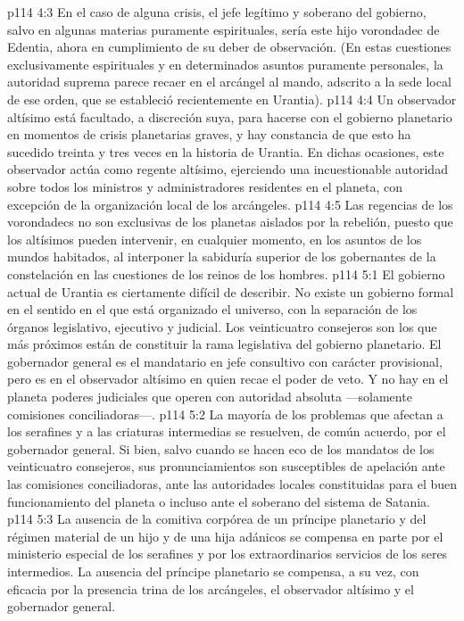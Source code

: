 \vs p114 4:3 En el caso de alguna crisis, el jefe legítimo y soberano del gobierno, salvo en algunas materias puramente espirituales, sería este hijo vorondadec de Edentia, ahora en cumplimiento de su deber de observación. (En estas cuestiones exclusivamente espirituales y en determinados asuntos puramente personales, la autoridad suprema parece recaer en el arcángel al mando, adscrito a la sede local de ese orden, que se estableció recientemente en Urantia).
\vs p114 4:4 \pc Un observador altísimo está facultado, a discreción suya, para hacerse con el gobierno planetario en momentos de crisis planetarias graves, y hay constancia de que esto ha sucedido treinta y tres veces en la historia de Urantia. En dichas ocasiones, este observador actúa como regente altísimo, ejerciendo una incuestionable autoridad sobre todos los ministros y administradores residentes en el planeta, con excepción de la organización local de los arcángeles.
\vs p114 4:5 Las regencias de los vorondadecs no son exclusivas de los planetas aislados por la rebelión, puesto que los altísimos pueden intervenir, en cualquier momento, en los asuntos de los mundos habitados, al interponer la sabiduría superior de los gobernantes de la constelación en las cuestiones de los reinos de los hombres.
\vs p114 5:1 El gobierno actual de Urantia es ciertamente difícil de describir. No existe un gobierno formal en el sentido en el que está organizado el universo, con la separación de los órganos legislativo, ejecutivo y judicial. Los veinticuatro consejeros son los que más próximos están de constituir la rama legislativa del gobierno planetario. El gobernador general es el mandatario en jefe consultivo con carácter provisional, pero es en el observador altísimo en quien recae el poder de veto. Y no hay en el planeta poderes judiciales que operen con autoridad absoluta ---solamente comisiones conciliadoras---.
\vs p114 5:2 La mayoría de los problemas que afectan a los serafines y a las criaturas intermedias se resuelven, de común acuerdo, por el gobernador general. Si bien, salvo cuando se hacen eco de los mandatos de los veinticuatro consejeros, sus pronunciamientos son susceptibles de apelación ante las comisiones conciliadoras, ante las autoridades locales constituidas para el buen funcionamiento del planeta o incluso ante el soberano del sistema de Satania.
\vs p114 5:3 La ausencia de la comitiva corpórea de un príncipe planetario y del régimen material de un hijo y de una hija adánicos se compensa en parte por el ministerio especial de los serafines y por los extraordinarios servicios de los seres intermedios. La ausencia del príncipe planetario se compensa, a su vez, con eficacia por la presencia trina de los arcángeles, el observador altísimo y el gobernador general.
